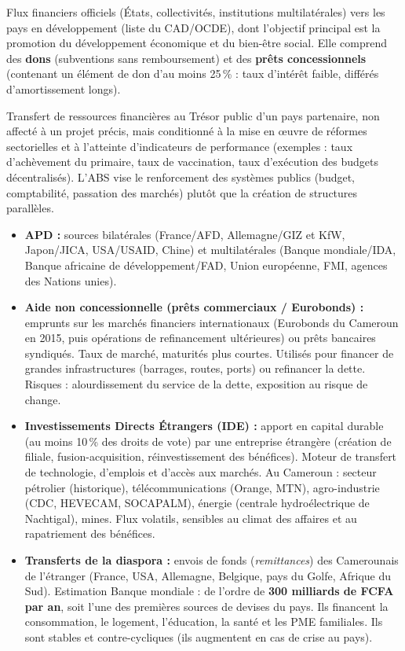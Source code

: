\documentclass[11pt]{article}
\begin{document}
\begin{definition}
Flux financiers officiels (États, collectivités, institutions multilatérales) vers les pays en développement (liste du CAD/OCDE), dont l'objectif principal est la promotion du développement économique et du bien-être social. Elle comprend des \textbf{dons} (subventions sans remboursement) et des \textbf{prêts concessionnels} (contenant un élément de don d'au moins 25\,\% : taux d'intérêt faible, différés d'amortissement longs).
\end{definition}

\begin{definition}
Transfert de ressources financières au Trésor public d'un pays partenaire, non affecté à un projet précis, mais conditionné à la mise en œuvre de réformes sectorielles et à l'atteinte d'indicateurs de performance (exemples : taux d'achèvement du primaire, taux de vaccination, taux d'exécution des budgets décentralisés). L'ABS vise le renforcement des systèmes publics (budget, comptabilité, passation des marchés) plutôt que la création de structures parallèles.
\end{definition}

\begin{itemize}
    \item \textbf{APD :} sources bilatérales (France/AFD, Allemagne/GIZ et KfW, Japon/JICA, USA/USAID, Chine) et multilatérales (Banque mondiale/IDA, Banque africaine de développement/FAD, Union européenne, FMI, agences des Nations unies).
    \item \textbf{Aide non concessionnelle (prêts commerciaux / Eurobonds) :} emprunts sur les marchés financiers internationaux (Eurobonds du Cameroun en 2015, puis opérations de refinancement ultérieures) ou prêts bancaires syndiqués. Taux de marché, maturités plus courtes. Utilisés pour financer de grandes infrastructures (barrages, routes, ports) ou refinancer la dette. Risques : alourdissement du service de la dette, exposition au risque de change.
    \item \textbf{Investissements Directs Étrangers (IDE) :} apport en capital durable (au moins 10\,\% des droits de vote) par une entreprise étrangère (création de filiale, fusion-acquisition, réinvestissement des bénéfices). Moteur de transfert de technologie, d'emplois et d'accès aux marchés. Au Cameroun : secteur pétrolier (historique), télécommunications (Orange, MTN), agro-industrie (CDC, HEVECAM, SOCAPALM), énergie (centrale hydroélectrique de Nachtigal), mines. Flux volatils, sensibles au climat des affaires et au rapatriement des bénéfices.
    \item \textbf{Transferts de la diaspora :} envois de fonds (\emph{remittances}) des Camerounais de l'étranger (France, USA, Allemagne, Belgique, pays du Golfe, Afrique du Sud). Estimation Banque mondiale : de l'ordre de \textbf{300 milliards de FCFA par an}, soit l'une des premières sources de devises du pays. Ils financent la consommation, le logement, l'éducation, la santé et les PME familiales. Ils sont stables et contre-cycliques (ils augmentent en cas de crise au pays).
\end{itemize}
\end{document}
